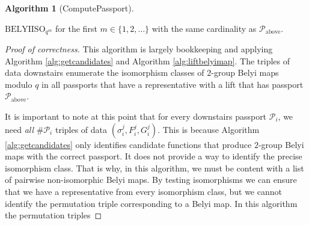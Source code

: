 \documentclass{dcthesis}
\newcommand{\mm}[1]{{\color{blue} \sf MM: [#1]}}
\numberwithin{equation}{section}
\theoremstyle{definition}
\newtheorem{alg}[equation]{Algorithm}
\theoremstyle{remark}
\begin{document}
{{{\begin{alg}[ComputePassport]
\begin{enumerate}
          $\mathrm{BELYIISO}_{q^m}$
          for the first $m\in\{1,2,\dots\}$
          with the same cardinality
          as $\mathcal{P}_\text{above}$.
      \end{enumerate}
    \end{alg}
    \begin{proof}[Proof of correctness]
      This algorithm is largely bookkeeping
      and applying Algorithm
      \ref{alg:getcandidates}
      and Algorithm
      \ref{alg:liftbelyimap}.
      The triples of data downstairs
      enumerate the isomorphism classes
      of $2$-group Belyi maps modulo $q$
      in all passports that have a representative
      with a lift that has passport
      $\mathcal{P}_\text{above}$.
      \par
      It is important to note at this point
      that for every downstairs passport
      $\mathcal{P}_i$,
      we need \emph{all} $\#\mathcal{P}_i$
      triples of data
      $(\sigma_i^j,F_i^j,G_i^j)$.
      This is because
      Algorithm \ref{alg:getcandidates}
      only identifies candidate functions
      that produce $2$-group Belyi maps
      with the correct passport.
      It does not provide a way to identify
      the precise isomorphism class.
      That is why,
      in this algorithm,
      we must be content with a list of
      pairwise
      non-isomorphic Belyi maps.
      By testing isomorphisms we can ensure
      that we have a representative
      from every isomorphism class,
      but we cannot identify the permutation
      triple corresponding to a Belyi map.
      In this algorithm the permutation triples

\end{proof}}}}
\end{document}
